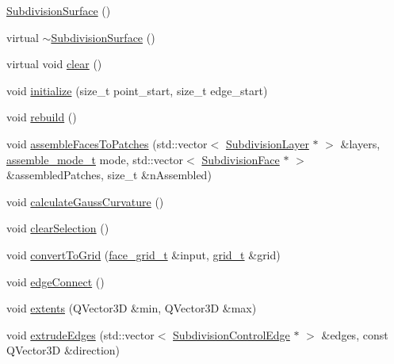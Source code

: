 \begin{DoxyCompactItemize}
\item 
\hyperlink{classShipCAD_1_1SubdivisionSurface_a507ea9cd5354e1d14fe24d52da505934}{Subdivision\-Surface} ()
\item 
virtual \hyperlink{classShipCAD_1_1SubdivisionSurface_a4f1b66a4d9e9f8ac3dbd956e2113a594}{$\sim$\-Subdivision\-Surface} ()
\item 
virtual void \hyperlink{classShipCAD_1_1SubdivisionSurface_a80ab3bd6372a8465d69f71034a353e06}{clear} ()
\item 
void \hyperlink{classShipCAD_1_1SubdivisionSurface_a13cfd2714344c9b85aad8d123538db48}{initialize} (size\-\_\-t point\-\_\-start, size\-\_\-t edge\-\_\-start)
\item 
void \hyperlink{classShipCAD_1_1SubdivisionSurface_a259856fc21f2bc1eebbc52f10dd59469}{rebuild} ()
\item 
void \hyperlink{classShipCAD_1_1SubdivisionSurface_ad140279118fab3343a6aee5e544814ec}{assemble\-Faces\-To\-Patches} (std\-::vector$<$ \hyperlink{classShipCAD_1_1SubdivisionLayer}{Subdivision\-Layer} $\ast$ $>$ \&layers, \hyperlink{namespaceShipCAD_aaba70dc1c80dc540bef320cb9b720a20}{assemble\-\_\-mode\-\_\-t} mode, std\-::vector$<$ \hyperlink{classShipCAD_1_1SubdivisionFace}{Subdivision\-Face} $\ast$ $>$ \&assembled\-Patches, size\-\_\-t \&n\-Assembled)
\item 
void \hyperlink{classShipCAD_1_1SubdivisionSurface_a3aa7c4fd1fa84170a59e6c0549573c92}{calculate\-Gauss\-Curvature} ()
\item 
void \hyperlink{classShipCAD_1_1SubdivisionSurface_a2a984cc9ae8c78153113552cfb6321d5}{clear\-Selection} ()
\item 
void \hyperlink{classShipCAD_1_1SubdivisionSurface_a1deabf43f6a24c34a58889d0361b0959}{convert\-To\-Grid} (\hyperlink{classShipCAD_1_1SubdivisionSurface_a26a7d7b71acd662b1014ab39af4ee343}{face\-\_\-grid\-\_\-t} \&input, \hyperlink{classShipCAD_1_1SubdivisionSurface_a69d4a3ca038ee247d0abcffa6125df95}{grid\-\_\-t} \&grid)
\item 
void \hyperlink{classShipCAD_1_1SubdivisionSurface_aa0460120d8a093682ca352a47affdb87}{edge\-Connect} ()
\item 
void \hyperlink{classShipCAD_1_1SubdivisionSurface_abc1cf0168290242dfbe5dd0d178fa7cb}{extents} (Q\-Vector3\-D \&min, Q\-Vector3\-D \&max)
\item 
void \hyperlink{classShipCAD_1_1SubdivisionSurface_ac19570e1402deab738d2231d6bec9650}{extrude\-Edges} (std\-::vector$<$ \hyperlink{classShipCAD_1_1SubdivisionControlEdge}{Subdivision\-Control\-Edge} $\ast$ $>$ \&edges, const Q\-Vector3\-D \&direction)

\end{DoxyCompactItemize}

